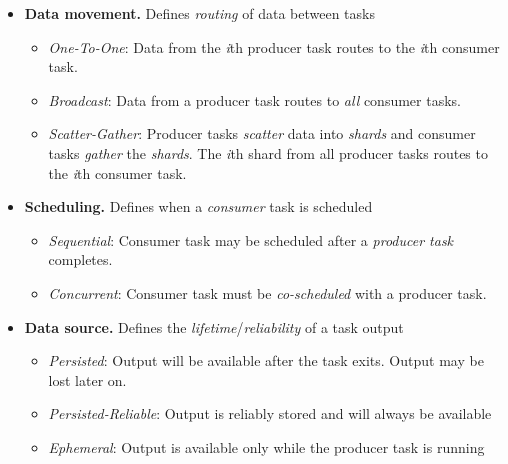 \documentclass[twocolumn]{article}
\begin{document}
\begin{itemize}
\itemsep1pt\parskip0pt
\item
  \textbf{Data movement.} Defines \emph{routing} of data between tasks\\

  \begin{itemize}
  \itemsep1pt\parskip0pt
  \item
    \emph{One-To-One}: Data from the \emph{i}th producer task routes to
    the \emph{i}th consumer task.\\
  \item
    \emph{Broadcast}: Data from a producer task routes to \emph{all}
    consumer tasks.\\
  \item
    \emph{Scatter-Gather}: Producer tasks \emph{scatter} data into
    \emph{shards} and consumer tasks \emph{gather} the \emph{shards}.
    The \emph{i}th shard from all producer tasks routes to the
    \emph{i}th consumer task.\\
  \end{itemize}
\item
  \textbf{Scheduling.} Defines when a \emph{consumer} task is
  scheduled\\

  \begin{itemize}
  \itemsep1pt\parskip0pt
  \item
    \emph{Sequential}: Consumer task may be scheduled after a
    \emph{producer task} completes.\\
  \item
    \emph{Concurrent}: Consumer task must be \emph{co-scheduled} with a
    producer task.\\
  \end{itemize}
\item
  \textbf{Data source.} Defines the \emph{lifetime}/\emph{reliability}
  of a task output\\

  \begin{itemize}
  \itemsep1pt\parskip0pt
  \item
    \emph{Persisted}: Output will be available after the task exits.
    Output may be lost later on.
  \item
    \emph{Persisted-Reliable}: Output is reliably stored and will always
    be available\\
  \item
    \emph{Ephemeral}: Output is available only while the producer task
    is running
  \end{itemize}
\end{itemize}
\end{document}
